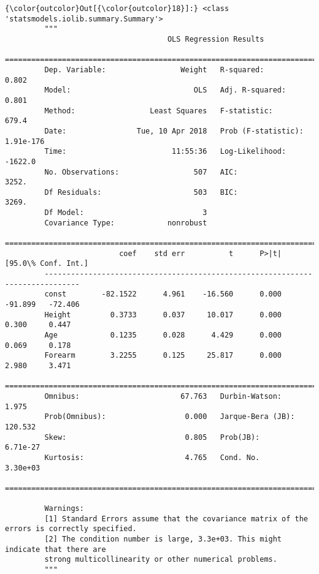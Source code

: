 \documentclass[11pt]{article}
\begin{document}
\begin{Verbatim}[commandchars=\\\{\}]
{\color{outcolor}Out[{\color{outcolor}18}]:} <class 'statsmodels.iolib.summary.Summary'>
         """
                                     OLS Regression Results                            
         ==============================================================================
         Dep. Variable:                 Weight   R-squared:                       0.802
         Model:                            OLS   Adj. R-squared:                  0.801
         Method:                 Least Squares   F-statistic:                     679.4
         Date:                Tue, 10 Apr 2018   Prob (F-statistic):          1.91e-176
         Time:                        11:55:36   Log-Likelihood:                -1622.0
         No. Observations:                 507   AIC:                             3252.
         Df Residuals:                     503   BIC:                             3269.
         Df Model:                           3                                         
         Covariance Type:            nonrobust                                         
         ==============================================================================
                          coef    std err          t      P>|t|      [95.0\% Conf. Int.]
         ------------------------------------------------------------------------------
         const        -82.1522      4.961    -16.560      0.000       -91.899   -72.406
         Height         0.3733      0.037     10.017      0.000         0.300     0.447
         Age            0.1235      0.028      4.429      0.000         0.069     0.178
         Forearm        3.2255      0.125     25.817      0.000         2.980     3.471
         ==============================================================================
         Omnibus:                       67.763   Durbin-Watson:                   1.975
         Prob(Omnibus):                  0.000   Jarque-Bera (JB):              120.532
         Skew:                           0.805   Prob(JB):                     6.71e-27
         Kurtosis:                       4.765   Cond. No.                     3.30e+03
         ==============================================================================
         
         Warnings:
         [1] Standard Errors assume that the covariance matrix of the errors is correctly specified.
         [2] The condition number is large, 3.3e+03. This might indicate that there are
         strong multicollinearity or other numerical problems.
         """
\end{Verbatim}
            
\end{document}
